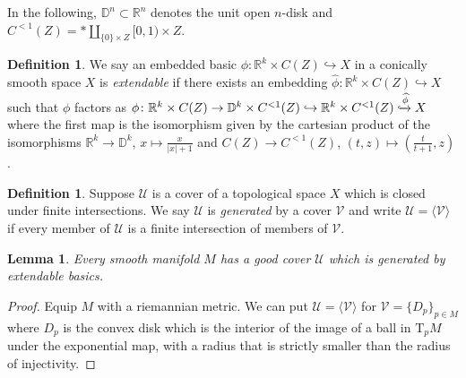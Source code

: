 \documentclass[11pt]{amsart}
\newcommand{\mcal}[1]{\mathcal{#1}}
\newcommand{\mbb}[1]{\mathbb{#1}}
\newcommand{\R}{\mbb{R}}
\newcommand{\Tangent}{\mathrm{T}}
\numberwithin{equation}{section}
\theoremstyle{definition}
\newtheorem{definition}[equation]{Definition}%
\theoremstyle{remark}
\theoremstyle{plain}
\newtheorem{lemma}[equation]{Lemma}
\begin{document}
In the following, $\mbb{D}^n\subset\R^n$ denotes the unit open $n$-disk and $C^{<1}(Z)=\ast\amalg_{\{0\}\times Z}[0,1)\times Z$.

\begin{definition}
    We say an embedded basic $\phi\colon \R^k\times C(Z)\hookrightarrow X$ in a conically smooth space $X$ is \emph{extendable} if there exists an embedding $\widehat{\phi}\colon\R^k\times C(Z)\hookrightarrow X$ such that $\phi$ factors as $\phi\colon\R^{k}\times C(Z)\to \mbb{D}^k\times C^{<1}(Z)\hookrightarrow \R^k\times C^{<1}(Z)\xhookrightarrow{\widehat{\phi}}X$ where the first map is the isomorphism given by the cartesian product of the isomorphisms $\R^k\to\mbb{D}^k$, $x\mapsto \frac{x}{|x|+1}$ and $C(Z)\to C^{<1}(Z)$, $(t,z)\mapsto (\frac{t}{t+1},z)$. 
\end{definition}

\begin{definition}
    Suppose $\mcal{U}$ is a cover of a topological space $X$ which is closed under finite intersections. We say $\mcal{U}$ is \emph{generated} by a cover $\mcal{V}$ and write $\mcal{U}=\langle\mcal{V}\rangle$ if every member of $\mcal{U}$ is a finite intersection of members of $\mcal{V}$.
\end{definition}

\begin{lemma}\label{2978BNV}
    Every smooth manifold $M$ has a good cover $\mcal{U}$ which is generated by extendable basics.
\end{lemma}
\begin{proof}
    Equip $M$ with a riemannian metric. We can put $\mcal{U}=\langle\mcal{V}\rangle$ for $\mcal{V}=\{D_p\}_{p\in M}$ where $D_p$ is the convex disk which is the interior of the image of a ball in $\Tangent_p M$ under the exponential map, with a radius that is strictly smaller than the radius of injectivity.
\end{proof}
\end{document}
